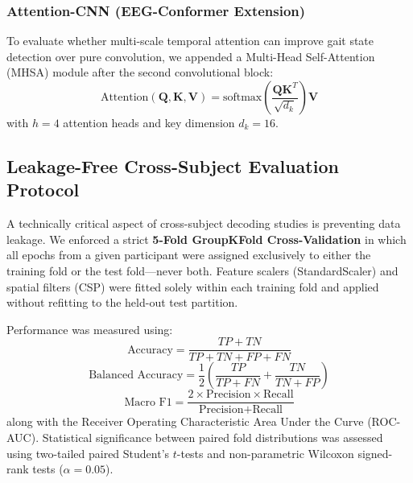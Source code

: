 \documentclass[11pt,a4paper]{article}
\begin{document}
\subsubsection{Attention-CNN (EEG-Conformer Extension)}
To evaluate whether multi-scale temporal attention can improve gait state detection over pure convolution, we appended a Multi-Head Self-Attention (MHSA) module after the second convolutional block:
\begin{equation}
    \text{Attention}(\mathbf{Q}, \mathbf{K}, \mathbf{V}) = \text{softmax}\left( \frac{\mathbf{Q}\mathbf{K}^T}{\sqrt{d_k}} \right) \mathbf{V}
\end{equation}
with $h = 4$ attention heads and key dimension $d_k = 16$.

\subsection{Leakage-Free Cross-Subject Evaluation Protocol}
A technically critical aspect of cross-subject decoding studies is preventing data leakage. We enforced a strict \textbf{5-Fold GroupKFold Cross-Validation} in which all epochs from a given participant were assigned exclusively to either the training fold or the test fold---never both. Feature scalers (StandardScaler) and spatial filters (CSP) were fitted solely within each training fold and applied without refitting to the held-out test partition.

Performance was measured using:
\begin{equation}
    \text{Accuracy} = \frac{TP + TN}{TP + TN + FP + FN}
\end{equation}
\begin{equation}
    \text{Balanced Accuracy} = \frac{1}{2} \left( \frac{TP}{TP + FN} + \frac{TN}{TN + FP} \right)
\end{equation}
\begin{equation}
    \text{Macro F1} = \frac{2 \times \text{Precision} \times \text{Recall}}{\text{Precision} + \text{Recall}}
\end{equation}
along with the Receiver Operating Characteristic Area Under the Curve (ROC-AUC). Statistical significance between paired fold distributions was assessed using two-tailed paired Student's $t$-tests and non-parametric Wilcoxon signed-rank tests ($\alpha = 0.05$).

\end{document}
